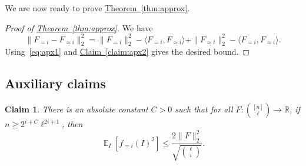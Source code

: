 \documentclass[11pt]{article}
\newcommand{\expref}[2]{\texorpdfstring{\hyperref[#2]{#1~\ref{#2}}}{#1~\ref{#2}}}
\newtheorem{claim}[theorem]{Claim}
\newcommand\Expect[2]{{\mathop{\mathbb{E}}_{#1}\left[ {#2} \right]}}
\newcommand\norm[1]{\| #1 \|}
\newcommand\inner[2]{\langle{#1},{#2}\rangle}
\renewcommand\geq{\geqslant}
\renewcommand\leq{\leqslant}
\newcommand\lvlfn[2]{{#1}_{={#2}}}
\newcommand\approxlvlfn[2]{{#1}_{\approx{#2}}}
\begin{document}
We are now ready to prove \expref{Theorem}{thm:approx}.
\begin{proof}[Proof of \expref{Theorem}{thm:approx}]
  We have
  \[
  \norm{\lvlfn{F}{i} - \approxlvlfn{F}{i}}_2^2
  =\norm{\lvlfn{F}{i}}_2^2 - \inner{\lvlfn{F}{i}}{\approxlvlfn{F}{i}}
  +\norm{\approxlvlfn{F}{i}}_2^2 - \inner{\lvlfn{F}{i}}{\approxlvlfn{F}{i}}.
  \]
  Using~\eqref{eq:apx1} and \expref{Claim}{claim:apx2} gives the desired bound.
\end{proof}

\subsection{Auxiliary claims}
\begin{claim}\label{claim:mock_parseval}
  There is an absolute constant $C>0$ such that for all $F\colon \binom{[n]}{\ell}\to\mathbb{R}$, if $n\geq 2^{i+C} \ell^{2i+1}$, then
  \[
  \Expect{I}{\lvlfn{f}{i}(I)^2}\leq \frac{2\norm{F}_2^2}{\sqrt{\ell\choose i}}.
  \]
\end{claim}
\end{document}
